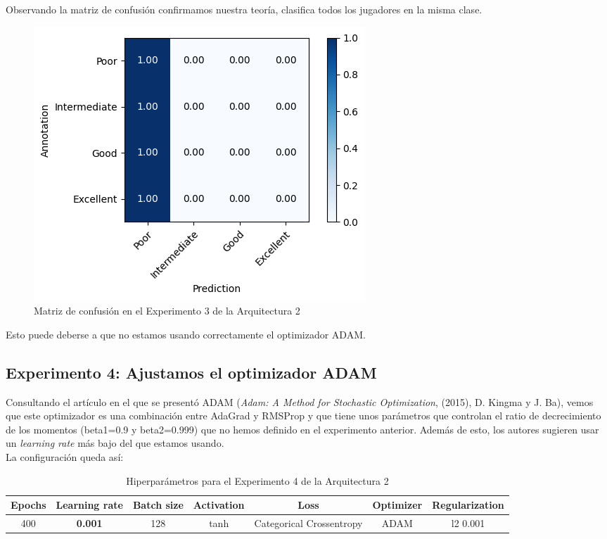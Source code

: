 \documentclass{article}
\begin{document}
			Observando la matriz de confusi\'on confirmamos nuestra teor\'ia, clasifica todos los jugadores en la misma clase.
			\begin{figure}[!h]
				\begin{center}
					\includegraphics[scale=0.7]{cm-a2-e3.png}		
					\caption{Matriz de confusi\'on en el Experimento 3 de la Arquitectura 2}	
					\label{cm-a2-e3}
				\end{center}
			\end{figure}
			
			Esto puede deberse a que no estamos usando correctamente el optimizador ADAM.
			
			
		\subsection{Experimento 4: Ajustamos el optimizador ADAM}
		\label{s-a2-e4}
			Consultando el art\'iculo en el que se present\'o ADAM (\textit{Adam: A Method for Stochastic Optimization}, (2015), D. Kingma y J. Ba), vemos que este optimizador es una combinaci\'on entre AdaGrad y RMSProp y que tiene unos par\'ametros que controlan el ratio de decrecimiento de los momentos (beta1=0.9 y beta2=0.999) que no hemos definido en el experimento anterior. Adem\'as de esto, los autores sugieren usar un \textit{learning rate} m\'as bajo del que estamos usando.\\
			
			La configuraci\'on queda as\'i:
			\begin{table}[!h]
				\begin{center}
					\begin{tabular}{| c | c | c | c | c | c | c |}
						\textbf{Epochs} & \textbf{Learning rate} & \textbf{Batch size} & \textbf{Activation} & \textbf{Loss} & \textbf{Optimizer} & \textbf{Regularization} \\ \hline
						400 & \textbf{0.001} & 128 & tanh & Categorical Crossentropy & ADAM & l2 0.001
					\end{tabular}
					\caption{Hiperpar\'ametros para el Experimento 4 de la Arquitectura 2}
					\label{tab:hip-a2-e4}
				\end{center}
			\end{table}
			
\end{document}
